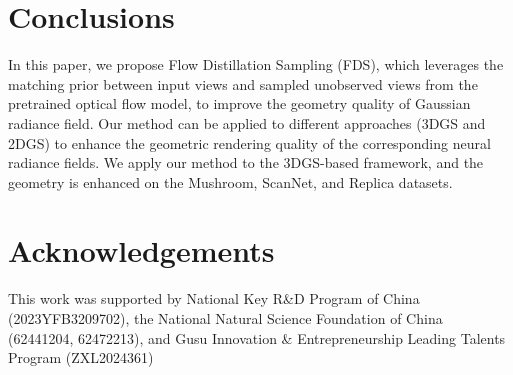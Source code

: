 \section{Conclusions}
In this paper, we propose Flow Distillation Sampling (FDS), which
leverages the matching prior between input views and 
sampled unobserved views from the pretrained optical flow model, to improve the geometry quality
of Gaussian radiance field. 
Our method can be applied to different approaches (3DGS and 2DGS) to enhance the geometric rendering quality of the corresponding neural radiance fields.
We apply our method to the 3DGS-based framework, 
and the geometry is enhanced on the Mushroom, ScanNet, and Replica datasets.

\section*{Acknowledgements} This work was supported by 
National Key R\&D Program of China (2023YFB3209702), 
the National Natural Science Foundation of 
China (62441204, 62472213), and Gusu 
Innovation \& Entrepreneurship Leading Talents Program (ZXL2024361)